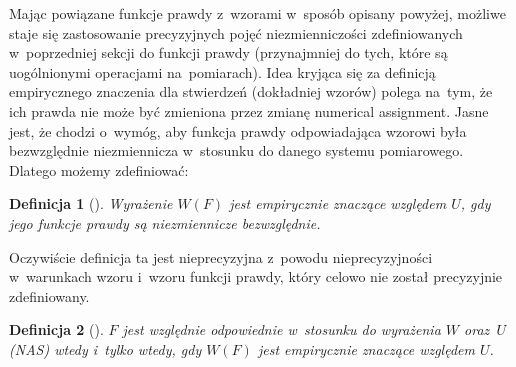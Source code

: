 \documentclass[12pt,a4paper]{report}
\newtheorem{definition}{Definicja}[chapter]
\begin{document}
Mając powiązane funkcje prawdy z~wzorami w~sposób opisany powyżej, możliwe staje się zastosowanie precyzyjnych pojęć niezmienniczości zdefiniowanych w~poprzedniej sekcji do funkcji prawdy (przynajmniej do tych, które są uogólnionymi operacjami na~pomiarach). Idea kryjąca się za definicją empirycznego znaczenia dla stwierdzeń (dokładniej wzorów) polega na~tym, że ich prawda nie może być zmieniona przez zmianę numerical assignment. Jasne jest, że chodzi o~wymóg, aby funkcja prawdy odpowiadająca wzorowi była bezwzględnie niezmiennicza w~stosunku do danego systemu pomiarowego. Dlatego możemy zdefiniować:
\begin{definition}[{\citep[Def. 7]{adams1965theory}}]
Wyrażenie $W(F)$ jest empirycznie znaczące względem $U$, gdy jego funkcje prawdy są niezmiennicze bezwzględnie.
\end{definition}
Oczywiście definicja ta jest nieprecyzyjna z~powodu nieprecyzyjności w~warunkach wzoru i~wzoru funkcji prawdy, który celowo nie został precyzyjnie zdefiniowany. 
\begin{definition}[{\citep[Def. 8]{adams1965theory}}]
$F$ jest względnie odpowiednie w~stosunku do wyrażenia $W$ oraz~$U$ (NAS) wtedy i~tylko wtedy, gdy $W(F)$ jest empirycznie znaczące względem $U$.
\end{definition}
\end{document}
